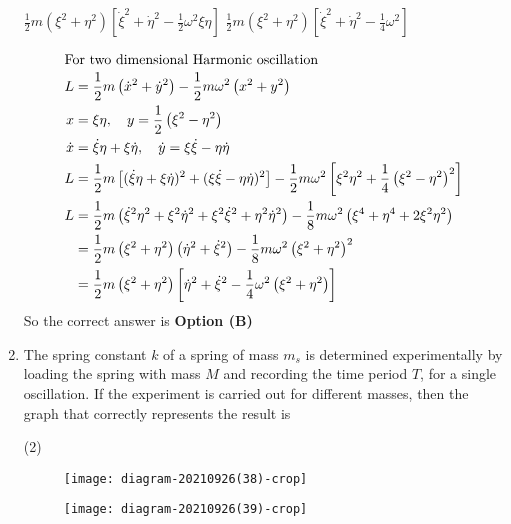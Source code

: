 \begin{enumerate}
\begin{tasks}
\task[\textbf{C.}] $\frac{1}{2} m\left(\xi^{2}+\eta^{2}\right)\left[\dot{\xi}^{2}+\dot{\eta}^{2}-\frac{1}{2} \omega^{2} \xi \eta\right]$
\task[\textbf{D.}] $\frac{1}{2} m\left(\xi^{2}+\eta^{2}\right)\left[\dot{\xi}^{2}+\dot{\eta}^{2}-\frac{1}{4} \omega^{2}\right]$
\end{tasks}
\begin{answer}
\begin{align*}
\intertext{For two dimensional Harmonic oscillation}
L&=\frac{1}{2} m\left(\dot{x}^{2}+\dot{y}^{2}\right)-\frac{1}{2} m \omega^{2}\left(x^{2}+y^{2}\right)\\
x&=\xi \eta, \quad y=\frac{1}{2}\left(\xi^{2}-\eta^{2}\right)\\
\dot{x}&=\dot{\xi} \eta+\xi \dot{\eta}, \quad \dot{y}=\xi \dot{\xi}-\eta \dot{\eta}\\
L&=\frac{1}{2} m\left[(\dot{\xi} \eta+\xi \dot{\eta})^{2}+(\xi \dot{\xi}-\eta \dot{\eta})^{2}\right]-\frac{1}{2} m \omega^{2}\left[\xi^{2} \eta^{2}+\frac{1}{4}\left(\xi^{2}-\eta^{2}\right)^{2}\right]\\
L&=\frac{1}{2} m\left(\dot{\xi}^{2} \eta^{2}+\xi^{2} \dot{\eta}^{2}+\xi^{2} \dot{\xi}^{2}+\eta^{2} \dot{\eta}^{2}\right)-\frac{1}{8} m \omega^{2}\left(\xi^{4}+\eta^{4}+2 \xi^{2} \eta^{2}\right)\\
&=\frac{1}{2} m\left(\xi^{2}+\eta^{2}\right)\left(\dot{\eta}^{2}+\dot{\xi}^{2}\right)-\frac{1}{8} m \omega^{2}\left(\xi^{2}+\eta^{2}\right)^{2}\\
&=\frac{1}{2} m\left(\xi^{2}+\eta^{2}\right)\left[\dot{\eta}^{2}+\dot{\xi}^{2}-\frac{1}{4} \omega^{2}\left(\xi^{2}+\eta^{2}\right)\right]
\end{align*}
So the correct answer is \textbf{Option (B)}
\end{answer}	
\item The spring constant $k$ of a spring of mass $m_{s}$ is determined experimentally by loading the spring with mass $M$ and recording the time period $T$, for a single oscillation. If the experiment is carried out for different masses, then the graph that correctly represents the result is
{}
\begin{tasks}(2)
\task[\textbf{A.}] \begin{figure}[H]
	\centering
	\texttt{[image: diagram-20210926(38)-crop]}
\end{figure}
\task[\textbf{B.}] \begin{figure}[H]
	\centering
	\texttt{[image: diagram-20210926(39)-crop]}
\end{figure}

\end{tasks}
\end{enumerate}
